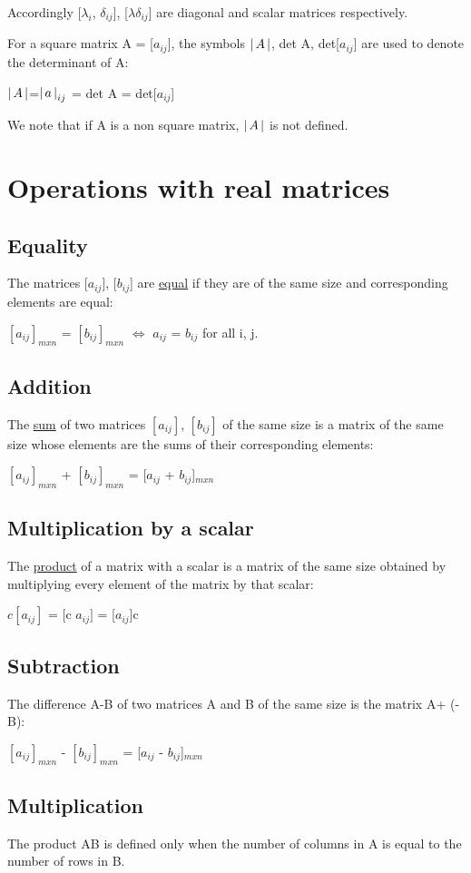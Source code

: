 \documentclass[11pt]{amsbook}
\begin{document}

Accordingly  [$\lambda_{i}$, $\delta_{ij}$], [$\lambda\delta_{ij}$] are diagonal and scalar matrices respectively.

For a square matrix A = [$a_{ij}$], the symbols $\left \lvert \, A \, \right \rvert$, det A, det[$a_{ij}$] are used to denote the determinant of A:
\begin{center}
$\left \lvert \, A \, \right \rvert$=$\left \lvert \, a \, \right \rvert_{ij}$ = det A = det[$a_{ij}$]
\end{center}
We note that if A is a non  square matrix, $\left \lvert \, A \, \right \rvert$ is not defined.

\section{Operations with real matrices}

\subsection{Equality} The matrices [$a_{ij}$], [$b_{ij}$] are \underline{equal} if they are of the same size and corresponding elements are equal:
\begin{center}
 $[a_{ij}]_{mxn}$ = $[b_{ij}]_{mxn}$ $\iff$ $a_{ij}$ = $b_{ij}$ for all i, j.
\end{center}

\subsection{Addition} The \underline{sum} of two matrices $[a_{ij}]$, $[b_{ij}]$ of the same size is a matrix of the same size whose elements are the sums of their corresponding elements:
\begin{center}
 $[a_{ij}]_{mxn}$ + $[b_{ij}]_{mxn}$ = [$a_{ij}$ + $b_{ij}$]$_{mxn}$
\end{center}

\subsection{Multiplication by a scalar} The \underline{product} of a matrix with a scalar is a matrix of the same size obtained by multiplying every element of the matrix by that scalar:
\begin{center}
 $c[a_{ij}]$ = [c $a_{ij}]$ = [$a_{ij}$]c
\end{center}

\subsection{Subtraction} The difference A-B of two matrices A and B of the same size is the matrix A+ (- B):
\begin{center}
 $[a_{ij}]_{mxn}$ - $[b_{ij}]_{mxn}$ = [$a_{ij}$ - $b_{ij}$]$_{mxn}$
\end{center}

\subsection{Multiplication} The product AB is defined only when the number of columns in A is equal to the number of rows in B.
\end{document}
